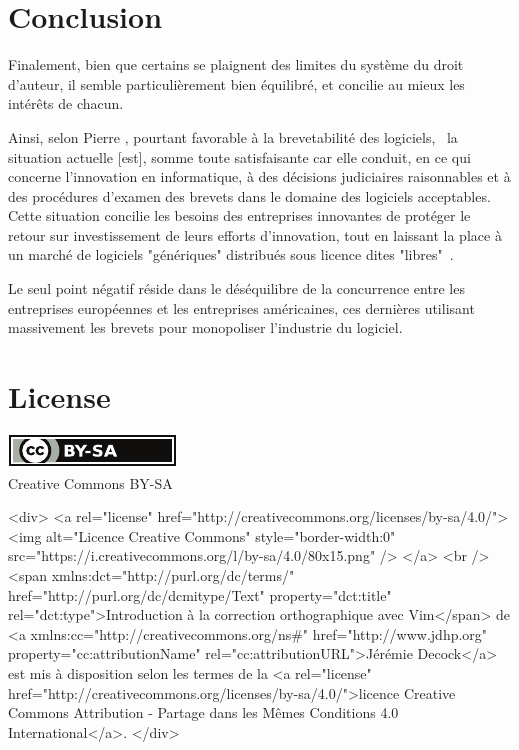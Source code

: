 \documentclass{report}
\begin{document}
\chapter*{Conclusion}
Finalement, bien que certains se plaignent des limites du système du droit d'auteur, il semble particulièrement bien équilibré, et concilie au mieux les intérêts de chacun.

Ainsi, selon Pierre , pourtant favorable à la brevetabilité des logiciels, \og~la situation  actuelle [est], somme toute satisfaisante car elle conduit, en ce qui concerne l'innovation en informatique, à des décisions judiciaires raisonnables et à des procédures d'examen des brevets dans le domaine des logiciels acceptables. Cette situation concilie les besoins des entreprises innovantes de protéger le retour sur investissement de leurs efforts d'innovation, tout en laissant la place à un marché de logiciels "génériques" distribués sous licence dites "libres"~\fg.

Le seul point négatif réside dans le déséquilibre de la concurrence entre les entreprises européennes et les entreprises américaines, ces dernières utilisant massivement les brevets pour monopoliser l'industrie du logiciel.

\chapter*{License}\label{sec:license}

\ifpdf
    \begin{center}
        \href{http://creativecommons.org/licenses/by-sa/2.0/fr/}{\includegraphics[width=.15\linewidth]{fig/cc_by_sa_small}}\\
        \small{Creative Commons BY-SA}
    \end{center}
\else
    \begin{rawhtml}

        <div>
            <a rel="license" href="http://creativecommons.org/licenses/by-sa/4.0/">
                <img alt="Licence Creative Commons" style="border-width:0" src="https://i.creativecommons.org/l/by-sa/4.0/80x15.png" />
            </a>
            <br />
            <span xmlns:dct="http://purl.org/dc/terms/" href="http://purl.org/dc/dcmitype/Text" property="dct:title" rel="dct:type">Introduction à la correction orthographique avec Vim</span> de <a xmlns:cc="http://creativecommons.org/ns#" href="http://www.jdhp.org" property="cc:attributionName" rel="cc:attributionURL">Jérémie Decock</a> est mis à disposition selon les termes de la <a rel="license" href="http://creativecommons.org/licenses/by-sa/4.0/">licence Creative Commons Attribution -  Partage dans les Mêmes Conditions 4.0 International</a>.
        </div>

    \end{rawhtml}
\fi
\end{document}
